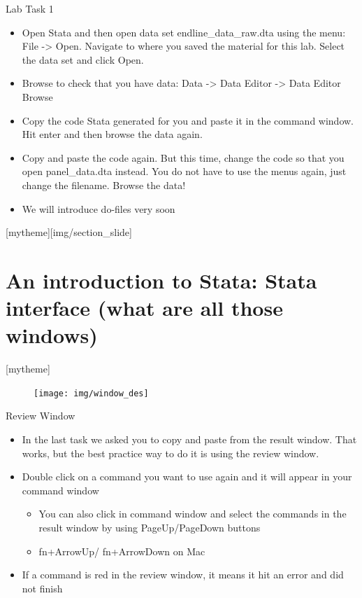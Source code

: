 \documentclass[aspectratio=169]{beamer}
\newcommand{\sectionpic}[2]{
	\setbeamertemplate{section page}[mytheme][#2]
	\section{#1}
	\setbeamertemplate{section page}[mytheme]
}
\begin{document}
\begin{frame}{Lab Task 1}
\begin{itemize}
	\item Open Stata and then open data set endline\_data\_raw.dta using the menu: File -> Open. \newline Navigate to where you saved the material for this lab. Select the data set and click Open.
	\item Browse to check that you have data: Data -> Data Editor -> Data Editor Browse 
	\item Copy the code Stata generated for you and paste it in the command window. Hit enter and then browse the data again.
	\item Copy and paste the code again. But this time, change the code so that you open panel\_data.dta instead. You do not have to use the menus again, just change the filename. Browse the data!
	\item We will introduce do-files very soon
\end{itemize}
\end{frame}


\sectionpic{An introduction to Stata: Stata interface (what are all those windows)}{img/section_slide}

\begin{frame}{}
\begin{figure}
	\centering
	\texttt{[image: img/window\_des]}
\end{figure}
\end{frame}

\begin{frame}{Review Window}

\begin{itemize}
	\item In the last task we asked you to copy and paste from the result window. That works, but the best practice way to do it is using the review window. 
	
	\item Double click on a command you want to use again and it will appear in your command window
	\begin{itemize}
		\item You can also click in command window and select the commands in the result window by using PageUp/PageDown buttons
		\item fn+ArrowUp/ fn+ArrowDown on Mac
	\end{itemize}
	\item If a command is red in the review window, it means it hit an error and did not finish
		
\end{itemize}

\end{frame}
\end{document}

